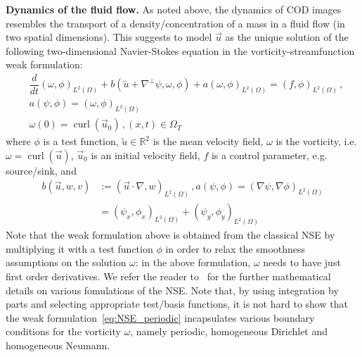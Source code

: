 \documentclass[onecolumn, 12pt, conference]{ieeeconf}
\newcommand{\R}{\mathbb{R}}
\newcommand{\Lt}{L^2(\Omega)}
\renewcommand{\u}{\vec{u}}
\newcommand{\curl}{\operatorname{curl}}
\begin{document}
\textbf{Dynamics of the fluid flow.} As noted above, the dynamics of COD images resembles the transport of a density/concentration of a mass in a fluid flow (in two spatial dimensions). This suggests to model $\u$ as the unique solution of the following two-dimensional Navier-Stokes equation in the vorticity-streamfunction weak formulation:
\begin{equation}
  \label{eq:NSE_periodic}
  \begin{split}
    &\dfrac{d}{dt}(\omega,\phi)_{\Lt} + b(\tilde u+\nabla^\perp\psi,\omega,\phi)+a(\omega,\phi)_{\Lt}
    =(f,\phi)_{\Lt}\,,\\ &a(\psi,\phi) = (\omega,\phi)_{\Lt}\\
    &\omega(0)=\curl(\u_0)\,, (x,t)\in\Omega_T
  \end{split}
\end{equation}
where $\phi$ is a test function, $\tilde u\in\R^2$ is the mean velocity field, $\omega$ is the vorticity, i.e. $\omega=\curl(\u)$, $\u_0$ is an initial velocity field, $f$ is a control parameter, e.g. source/sink, and \[
\begin{split}
b(\u,w,v)&:=(\u\cdot\nabla, w)_{\Lt}\,,a(\psi,\phi) = (\nabla\psi,\nabla\phi)_{\Lt}\\
& = (\psi_x,\phi_x)_{\Lt}+(\psi_y,\phi_y)_{\Lt}
\end{split}
\]
Note that the weak formulation above is obtained from the classical NSE by multiplying it with a test function $\phi$ in order to relax the smoothness assumptions on the solution $\omega$: in the above formulation, $\omega$ needs to have just first order derivatives.  We refer the reader to~\cite{MajdaBertozzi2002} for the further mathematical details on various fomulations of the NSE. Note that, by using integration by parts and selecting appropriate test/basis functions, it is not hard to show that the weak formulation~\eqref{eq:NSE_periodic} incapsulates various boundary conditions for the vorticity $\omega$, namely periodic, homogeneous Dirichlet and homogeneous Neumann. %
\end{document}
